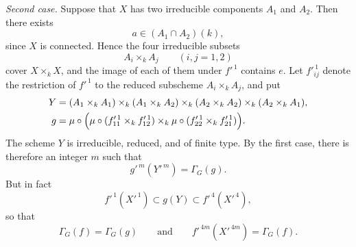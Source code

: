 \emph{Second case.}
Suppose that \(X\) has two irreducible components \(A_1\) and
\(A_2\). Then there exists
\[
  a\in(A_1\cap A_2)(k),
\]
since \(X\) is connected. Hence the four irreducible subsets
\[
  A_i\times_kA_j
  \qquad (i,j=1,2)
\]
cover \(X\times_kX\), and the image of each of them under
\(f'^{\,1}\) contains \(e\). Let \(f'^{\,1}_{ij}\) denote the restriction of
\(f'^{\,1}\) to the reduced subscheme \(A_i\times_kA_j\), and
put
\[
\begin{aligned}
  Y={}&
  (A_1\times_kA_1)
  \times_k(A_1\times_kA_2)
  \times_k(A_2\times_kA_2)
  \times_k(A_2\times_kA_1),\\
  g={}&
  \mu\circ\Bigl(
    \mu\circ
      (f'^{\,1}_{11}\times_k f'^{\,1}_{12})
    \times_k
    \mu\circ
      (f'^{\,1}_{22}\times_k f'^{\,1}_{21})
  \Bigr).
\end{aligned}
\]
The scheme \(Y\) is irreducible, reduced, and of finite type.
By the first case, there is therefore an integer \(m\) such
that
\[
  g'^{\,m}(Y'^{\,m})=\Gamma_G(g).
\]
But in fact
\label{form:sga3-VIB-7.4-two-component-chain}%
\[
  f'^{\,1}(X'^{\,1})
  \subset g(Y)
  \subset f'^{\,4}(X'^{\,4}),
\]
so that
\[
  \Gamma_G(f)=\Gamma_G(g)
  \qquad\text{and}\qquad
  f'^{\,4m}(X'^{\,4m})=\Gamma_G(f).
\]

